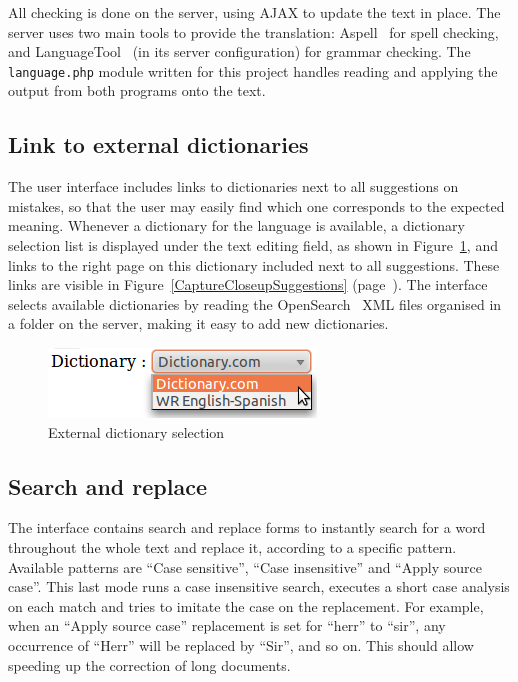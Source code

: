 \documentclass[11pt]{article}
\begin{document}
All checking is done on the server, using AJAX to update the text in 
place. 
The server uses two main tools to provide the translation: 
Aspell~\citep{Atkinson04} for spell checking, and 
LanguageTool~\citep{Naber03} (in its server configuration) for 
grammar checking. 
The {\tt\small language.php} module written for this project handles 
reading and applying the output from both programs onto the text.

\subsection{Link to external dictionaries}

The user interface includes links to dictionaries next to all 
suggestions on mistakes, so that the user may easily find which one 
corresponds to the expected meaning. 
Whenever a dictionary for the language is available, a dictionary 
selection list is displayed under the text editing field, as shown in 
Figure~\ref{CaptureCloseupDictionaries}, and links to the right page 
on this dictionary included next to all suggestions. 
These links are visible in Figure~\ref{CaptureCloseupSuggestions} 
(page~\pageref{CaptureCloseupSuggestions}).
The interface selects available dictionaries by reading the OpenSearch~\citep{opensearch05} 
XML files organised in a folder on the server, making it easy to add 
new dictionaries.

\begin{figure}[!h]
  \caption{\label{CaptureCloseupDictionaries} External dictionary 
  selection}
     \includegraphics[width=\columnwidth]{CaptureCloseupDictionaries.png}
\end{figure}

\subsection{Search and replace}

The interface contains search and replace forms to instantly search for 
a word throughout the whole text and replace it, according to a specific 
pattern.
Available patterns are ``Case sensitive'', ``Case insensitive'' and 
``Apply source case''. 
This last mode runs a case insensitive search, executes a short 
case analysis on each match and tries to imitate the case on the 
replacement. 
For example, when an ``Apply source case'' replacement is set for ``herr'' 
to ``sir'', any occurrence of ``Herr'' will be replaced by ``Sir'', and so on.
This should allow speeding up the correction of long documents.
\end{document}
